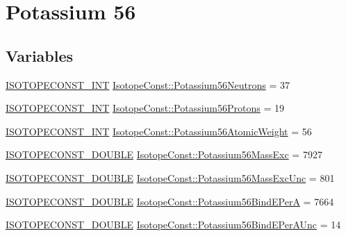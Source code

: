 \hypertarget{group___isotope_const-_potassium-_k56}{}\section{Potassium 56}
\label{group___isotope_const-_potassium-_k56}
\subsection*{Variables}
\begin{DoxyCompactItemize}
\item 
\mbox{\hyperlink{group___isotope_const-_macros_ga5f18360b3e99483a35c32d789e62621c}{I\+S\+O\+T\+O\+P\+E\+C\+O\+N\+S\+T\+\_\+\+I\+NT}} \mbox{\hyperlink{group___isotope_const-_potassium-_k56_ga9a0841081233062e35d91b5e96158400}{Isotope\+Const\+::\+Potassium56\+Neutrons}} = 37
\item 
\mbox{\hyperlink{group___isotope_const-_macros_ga5f18360b3e99483a35c32d789e62621c}{I\+S\+O\+T\+O\+P\+E\+C\+O\+N\+S\+T\+\_\+\+I\+NT}} \mbox{\hyperlink{group___isotope_const-_potassium-_k56_ga811c7c8235e08c3f40f7a4095fa99cb5}{Isotope\+Const\+::\+Potassium56\+Protons}} = 19
\item 
\mbox{\hyperlink{group___isotope_const-_macros_ga5f18360b3e99483a35c32d789e62621c}{I\+S\+O\+T\+O\+P\+E\+C\+O\+N\+S\+T\+\_\+\+I\+NT}} \mbox{\hyperlink{group___isotope_const-_potassium-_k56_gaaba8342e7a3a6be5698e773a4ca26858}{Isotope\+Const\+::\+Potassium56\+Atomic\+Weight}} = 56
\item 
\mbox{\hyperlink{group___isotope_const-_macros_ga8f45a7272ce02c0b4c65c44636ed719a}{I\+S\+O\+T\+O\+P\+E\+C\+O\+N\+S\+T\+\_\+\+D\+O\+U\+B\+LE}} \mbox{\hyperlink{group___isotope_const-_potassium-_k56_ga8c6c3e326f8274af503093e8233db5f6}{Isotope\+Const\+::\+Potassium56\+Mass\+Exc}} = 7927
\item 
\mbox{\hyperlink{group___isotope_const-_macros_ga8f45a7272ce02c0b4c65c44636ed719a}{I\+S\+O\+T\+O\+P\+E\+C\+O\+N\+S\+T\+\_\+\+D\+O\+U\+B\+LE}} \mbox{\hyperlink{group___isotope_const-_potassium-_k56_gaf5cf7ce2efb298d2b365457c84aa820b}{Isotope\+Const\+::\+Potassium56\+Mass\+Exc\+Unc}} = 801
\item 
\mbox{\hyperlink{group___isotope_const-_macros_ga8f45a7272ce02c0b4c65c44636ed719a}{I\+S\+O\+T\+O\+P\+E\+C\+O\+N\+S\+T\+\_\+\+D\+O\+U\+B\+LE}} \mbox{\hyperlink{group___isotope_const-_potassium-_k56_ga3dff93dc18dbcd78b9450b0fbad67693}{Isotope\+Const\+::\+Potassium56\+Bind\+E\+PerA}} = 7664
\item 
\mbox{\hyperlink{group___isotope_const-_macros_ga8f45a7272ce02c0b4c65c44636ed719a}{I\+S\+O\+T\+O\+P\+E\+C\+O\+N\+S\+T\+\_\+\+D\+O\+U\+B\+LE}} \mbox{\hyperlink{group___isotope_const-_potassium-_k56_ga6694a52b8d992be217bcbbc4bee6b3d6}{Isotope\+Const\+::\+Potassium56\+Bind\+E\+Per\+A\+Unc}} = 14

\end{DoxyCompactItemize}
